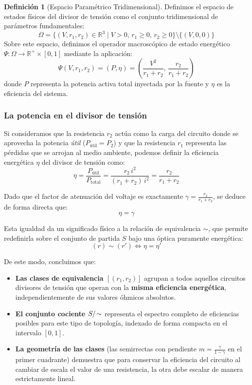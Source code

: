\documentclass[11pt, a4paper]{article}
\theoremstyle{definition}
\newtheorem{definition}{Definición}
\theoremstyle{plain}
\theoremstyle{plain}
\theoremstyle{remark}
\theoremstyle{remark}
\theoremstyle{remark}
\begin{document}
\begin{definition}[Espacio Paramétrico Tridimensional]
	Definimos el espacio de estados físicos del divisor de tensión como el conjunto tridimensional de parámetros fundamentales:
	\[ \Omega = \{ (V, r_1, r_2) \in \mathbb{R}^3 \mid V > 0, \, r_1 \ge 0, \, r_2 \ge 0 \} \setminus \{ (V, 0, 0) \} \]
	Sobre este espacio, definimos el operador macroscópico de estado energético $\Psi: \Omega \to \mathbb{R}^+ \times [0, 1]$ mediante la aplicación:
	\[ \Psi(V, r_1, r_2) = (P, \eta) = \left( \frac{V^2}{r_1 + r_2}, \, \frac{r_2}{r_1 + r_2} \right) \]
	donde $P$ representa la potencia activa total inyectada por la fuente y $\eta$ es la eficiencia del sistema.
\end{definition}



\subsubsection*{La potencia en el divisor de tensión}

Si consideramos que la resistencia $r_2$ actúa como la carga del circuito donde se aprovecha la potencia \textit{útil} ($P_{\text{útil}} = P_2$) y que la resistencia $r_1$ representa las pérdidas que se arrojan al medio ambiente, podemos definir la eficiencia energética $\eta$ del divisor de tensión como:
\[
\eta = \frac{P_{\text{útil}}}{P_{\text{total}}} = \frac{r_2 \, i^2}{(r_1 + r_2) \, i^2} = \frac{r_2}{r_1 + r_2}
\]

Dado que el factor de atenuación del voltaje es exactamente $\gamma = \frac{r_2}{r_1 + r_2}$, se deduce de forma directa que:
\[
\eta = \gamma
\]

Esta igualdad da un significado físico a la relación de equivalencia $\sim$, que permite  redefinirla sobre el conjunto de partida $S$ bajo una óptica puramente energética:
\[
(r) \sim (r') \iff \eta = \eta'
\]

\noindent
De este modo, concluimos que:
\begin{itemize}
	\item \textbf{Las clases de equivalencia $[(r_1, r_2)]$} agrupan a todos aquellos circuitos divisores de tensión que operan con la \textbf{misma eficiencia energética}, independientemente de sus valores óhmicos absolutos.
	\item \textbf{El conjunto cociente $S/\kern-0.15em\sim$} representa el espectro completo de eficiencias posibles para este tipo de topología, indexado de forma compacta en el intervalo $[0, 1]$.
	\item \textbf{La geometría de las clases} (las semirrectas con pendiente $m = \frac{\gamma}{1-\gamma}$ en el primer cuadrante) demuestra que para conservar la eficiencia del circuito al cambiar de escala el valor de una resistencia, la otra debe escalar de manera estrictamente lineal.
\end{itemize}
\end{document}
